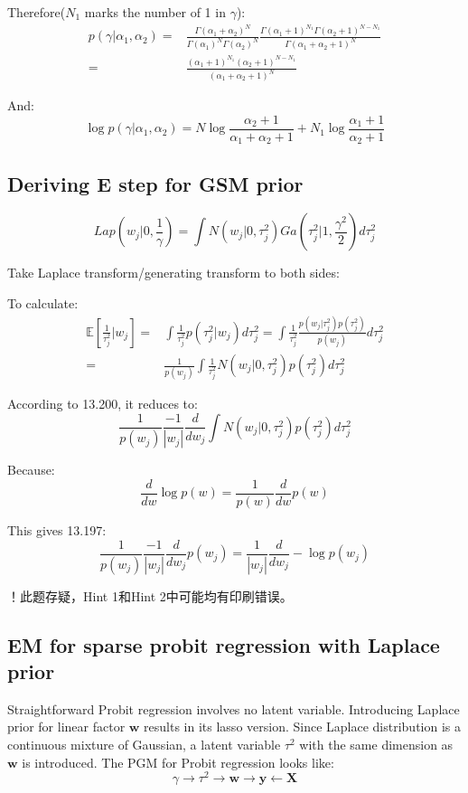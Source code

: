 \documentclass[UTF8]{ctexart}
\begin{document}
Therefore($N_{1}$ marks the number of 1 in $\gamma$):
\begin{align}
p(\gamma|\alpha_{1},\alpha_{2})=&\frac{\Gamma(\alpha_{1}+\alpha_{2})^{N}}{\Gamma(\alpha_{1})^{N}\Gamma(\alpha_{2})^{N}}\frac{\Gamma(\alpha_{1}+1)^{N_{1}}\Gamma(\alpha_{2}+1)^{N-N_{1}}}{\Gamma(\alpha_{1}+\alpha_{2}+1)^{N}}\nonumber \\
=&\frac{(\alpha_{1}+1)^{N_{1}}(\alpha_{2}+1)^{N-N_{1}}}{(\alpha_{1}+\alpha_{2}+1)^{N}}\nonumber
\end{align}

And:
$$\log p(\gamma|\alpha_{1},\alpha_{2})=N\log\frac{\alpha_{2}+1}{\alpha_{1}+\alpha_{2}+1} + N_{1} \log \frac{\alpha_{1}+1}{\alpha_{2}+1}$$

\subsection{Deriving E step for GSM prior}
$$Lap(w_{j}|0,\frac{1}{\gamma})=\int N(w_{j}|0,\tau_{j}^{2})Ga(\tau_{j}^{2}|1,\frac{\gamma^{2}}{2})d\tau_{j}^{2}$$

Take Laplace transform/generating transform to both sides:

To calculate:
\begin{align}
\mathbb{E}[\frac{1}{\tau_{j}^{2}}|w_{j}]=&\int \frac{1}{\tau_{j}^{2}}p(\tau_{j}^{2}|w_{j})d\tau_{j}^{2}=\int \frac{1}{\tau_{j}^{2}}\frac{p(w_{j}|\tau_{j}^{2})p(\tau_{j}^{2})}{p(w_{j})}d\tau_{j}^{2}\nonumber \\
=&\frac{1}{p(w_{j})}\int \frac{1}{\tau_{j}^{2}}N(w_{j}|0,\tau_{j}^{2})p(\tau_{j}^{2})d\tau_{j}^{2}\nonumber
\end{align}

According to 13.200, it reduces to:
$$\frac{1}{p(w_{j})}\frac{-1}{|w_{j}|}\frac{d}{dw_{j}}\int N(w_{j}|0,\tau_{j}^{2})p(\tau_{j}^{2})d\tau_{j}^{2}$$

Because:
$$\frac{d}{dw} \log p(w) = \frac{1}{p(w)}\frac{d}{dw}p(w)$$

This gives 13.197:
$$\frac{1}{p(w_{j})}\frac{-1}{|w_{j}|}\frac{d}{dw_{j}}p(w_{j})=\frac{1}{|w_{j}|}\frac{d}{dw_{j}}-\log p(w_{j})$$

！此题存疑，Hint 1和Hint 2中可能均有印刷错误。

\subsection{EM for sparse probit regression with Laplace prior}
Straightforward Probit regression involves no latent variable. Introducing Laplace prior for linear factor $\textbf{w}$ results in its lasso version. Since Laplace distribution is a continuous mixture of Gaussian, a latent variable $\tau^{2}$ with the same dimension as $\textbf{w}$ is introduced. The PGM for Probit regression looks like:
$$\gamma \rightarrow \tau^{2} \rightarrow \textbf{w} \rightarrow \textbf{y} \leftarrow \textbf{X}$$
\end{document}
